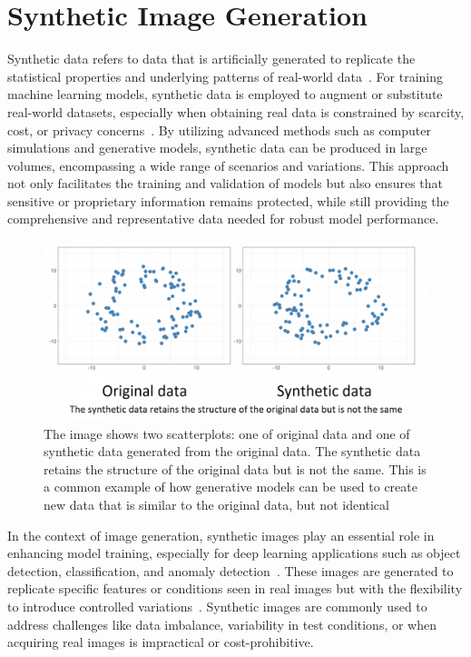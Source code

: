 \documentclass[12pt,DIV14,BCOR12mm,a4paper,footinclude=false,headinclude,parskip=half-,twoside,openright,cleardoublepage=empty,toc=index,bibliography=totoc,listof=totoc]{scrreprt}
\numberwithin{equation}{chapter}
\begin{document}
\section{Synthetic Image Generation}
Synthetic data refers to data that is artificially generated to replicate the statistical properties and underlying patterns of real-world data~\cite{raghunathan2021synthetic}. For training machine learning models, synthetic data is employed to augment or substitute real-world datasets, especially when obtaining real data is constrained by scarcity, cost, or privacy concerns~\cite{bolon2013review, abowd2008protective}. By utilizing advanced methods such as computer simulations and generative models, synthetic data can be produced in large volumes, encompassing a wide range of scenarios and variations. This approach not only facilitates the training and validation of models but also ensures that sensitive or proprietary information remains protected, while still providing the comprehensive and representative data needed for robust model performance.
\begin{figure}
	\centering
	\includegraphics[scale=.3]{../media/synthetic_data_image-1536x718.png}
	\caption{The image shows two scatterplots: one of original data and one of synthetic data generated from the original data. The synthetic data retains the structure of the original data but is not the same. This is a common example of how generative models can be used to create new data that is similar to the original data, but not identical~\cite{Karen:2020}}
	\label{synthetic_data}
\end{figure}
In the context of image generation, synthetic images play an essential role in enhancing model training, especially for deep learning applications such as object detection, classification, and anomaly detection~\cite{anderson2022synthetic}. These images are generated to replicate specific features or conditions seen in real images but with the flexibility to introduce controlled variations~\cite{lu2023machine}. Synthetic images are commonly used to address challenges like data imbalance, variability in test conditions, or when acquiring real images is impractical or cost-prohibitive.
\end{document}
